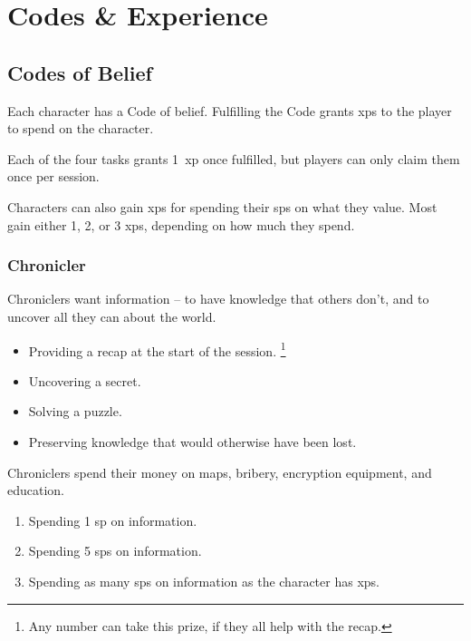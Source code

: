 \chapter[The Soldier's Code]{Codes \& Experience}
\label{codes}

\section{Codes of Belief}
\label{listOfCodes}

\begin{multicols}{2}
\noindent
Each character has a Code of belief.
Fulfilling the Code grants \glspl{xp} to the player to spend on the character.

Each of the four tasks grants 1~\gls{xp} once fulfilled, but players can only claim them once per session.

Characters can also gain \glspl{xp} for spending their \glspl{sp} on what they value.
Most gain either 1, 2, or 3 \glspl{xp}, depending on how much they spend.

\subsection{Chronicler}
\label{chronicler}

Chroniclers want information -- to have knowledge that others don't, and to uncover all they can about the world.

\begin{itemize}
  \item
  Providing a recap at the start of the session.%
  \footnote{Any number can take this prize, if they all help with the recap.}
  \item
  Uncovering a secret.
  \item
  Solving a puzzle.
  \item
  Preserving knowledge that would otherwise have been lost.
\end{itemize}

Chroniclers spend their money on maps, bribery, encryption equipment, and education.

\begin{enumerate}
  \item
  Spending 1 \gls{sp} on information.
  \item
  Spending 5 \glspl{sp} on information.
  \item
  Spending as many \glspl{sp} on information as the character has \glspl{xp}.
\end{enumerate}


\end{multicols}
